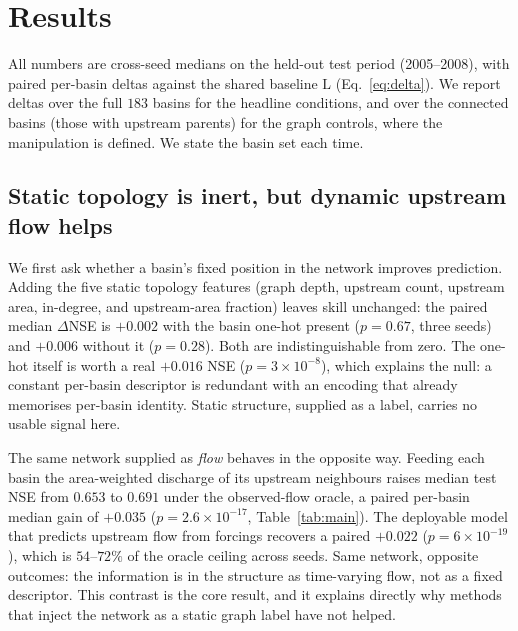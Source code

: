 \documentclass[11pt]{article}
\begin{document}
\section{Results}
\label{sec:results}

All numbers are cross-seed medians on the held-out test period (2005--2008), with paired per-basin
deltas against the shared baseline $\mathrm{L}$ (Eq.~\eqref{eq:delta}). We report deltas over the
full $183$ basins for the headline conditions, and over the connected basins (those with upstream
parents) for the graph controls, where the manipulation is defined. We state the basin set each time.

\subsection{Static topology is inert, but dynamic upstream flow helps}
\label{sec:res-contrast}

We first ask whether a basin's fixed position in the network improves prediction. Adding the five
static topology features (graph depth, upstream count, upstream area, in-degree, and upstream-area
fraction) leaves skill unchanged: the paired median $\Delta$NSE is $+0.002$ with the basin one-hot
present ($p=0.67$, three seeds) and $+0.006$ without it ($p=0.28$). Both are indistinguishable from
zero. The one-hot itself is worth a real $+0.016$ NSE ($p=3\times10^{-8}$), which explains the null:
a constant per-basin descriptor is redundant with an encoding that already memorises per-basin
identity. Static structure, supplied as a label, carries no usable signal here.

The same network supplied as \emph{flow} behaves in the opposite way. Feeding each basin the
area-weighted discharge of its upstream neighbours raises median test NSE from $0.653$ to $0.691$
under the observed-flow oracle, a paired per-basin median gain of $+0.035$ ($p=2.6\times10^{-17}$,
Table~\ref{tab:main}). The deployable model that predicts upstream flow from forcings recovers a
paired $+0.022$ ($p=6\times10^{-19}$), which is $54$--$72\%$ of the oracle ceiling across seeds. Same network,
opposite outcomes: the information is in the structure as time-varying flow, not as a fixed
descriptor. This contrast is the core result, and it explains directly why methods that inject the
network as a static graph label have not helped.
\end{document}
